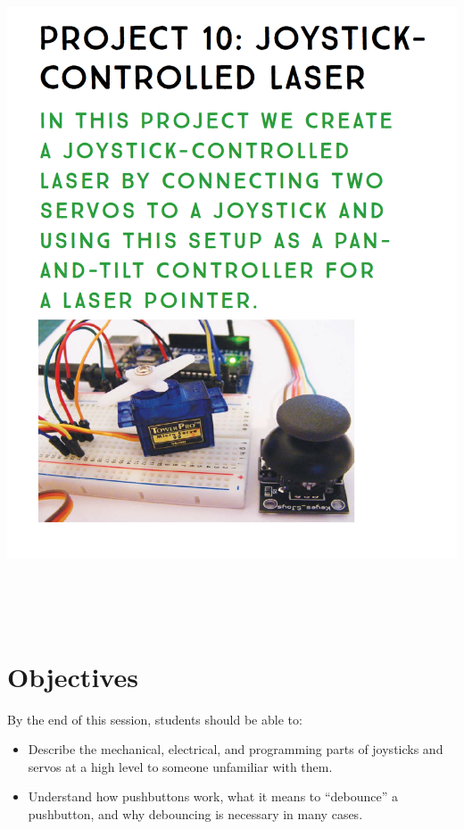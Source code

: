 \documentclass{article}
\begin{document}
\begin{center}
\includegraphics[width=\textwidth, height=20cm]{figures/title.png}
\end{center}

\section{Objectives}
By the end of this session, students should be able to:

\begin{itemize}
\item Describe the mechanical, electrical, and programming parts of joysticks and servos at a high
  level to someone unfamiliar with them.
\item Understand how pushbuttons work, what it means to ``debounce'' a pushbutton,
  and why debouncing is necessary in many cases.
\end{itemize}
\end{document}
